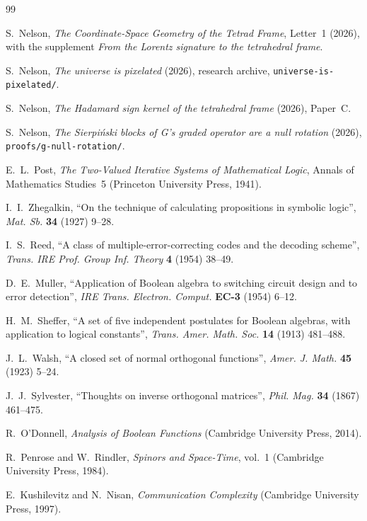\documentclass[twocolumn]{iopjournal}
\begin{document}
\begin{thebibliography}{99}

S.~Nelson,
\textit{The Coordinate-Space Geometry of the Tetrad Frame}, Letter~1
(2026), with the supplement \textit{From the Lorentz signature to the
tetrahedral frame}.

S.~Nelson,
\textit{The universe is pixelated} (2026), research archive,
\texttt{universe-is-pixelated/}.

S.~Nelson,
\textit{The Hadamard sign kernel of the tetrahedral frame} (2026),
Paper~C.

S.~Nelson,
\textit{The Sierpi\'nski blocks of G's graded operator are a null rotation} (2026),
\texttt{proofs/g-null-rotation/}.

E.~L.~Post,
\textit{The Two-Valued Iterative Systems of Mathematical Logic},
Annals of Mathematics Studies~5 (Princeton University Press, 1941).

I.~I.~Zhegalkin,
``On the technique of calculating propositions in symbolic logic'',
\textit{Mat. Sb.} \textbf{34} (1927) 9--28.

I.~S.~Reed,
``A class of multiple-error-correcting codes and the decoding
scheme'', \textit{Trans. IRE Prof. Group Inf. Theory} \textbf{4}
(1954) 38--49.

D.~E.~Muller,
``Application of Boolean algebra to switching circuit design and to
error detection'', \textit{IRE Trans. Electron. Comput.}
\textbf{EC-3} (1954) 6--12.

H.~M.~Sheffer,
``A set of five independent postulates for Boolean algebras, with
application to logical constants'', \textit{Trans. Amer. Math. Soc.}
\textbf{14} (1913) 481--488.

J.~L.~Walsh,
``A closed set of normal orthogonal functions'',
\textit{Amer. J. Math.} \textbf{45} (1923) 5--24.

J.~J.~Sylvester,
``Thoughts on inverse orthogonal matrices'',
\textit{Phil. Mag.} \textbf{34} (1867) 461--475.

R.~O'Donnell,
\textit{Analysis of Boolean Functions}
(Cambridge University Press, 2014).

R.~Penrose and W.~Rindler,
\textit{Spinors and Space-Time}, vol.~1
(Cambridge University Press, 1984).

E.~Kushilevitz and N.~Nisan,
\textit{Communication Complexity}
(Cambridge University Press, 1997).

\end{thebibliography}
\end{document}
